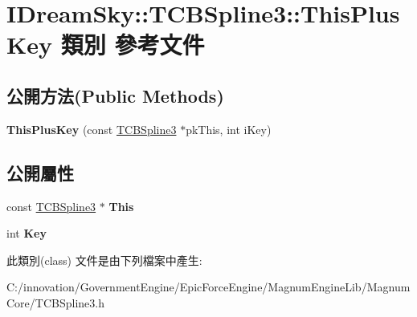 \hypertarget{class_i_dream_sky_1_1_t_c_b_spline3_1_1_this_plus_key}{}\section{I\+Dream\+Sky\+:\+:T\+C\+B\+Spline3\+:\+:This\+Plus\+Key 類別 參考文件}
\label{class_i_dream_sky_1_1_t_c_b_spline3_1_1_this_plus_key}
\subsection*{公開方法(Public Methods)}
\begin{DoxyCompactItemize}
\item 
{\bfseries This\+Plus\+Key} (const \hyperlink{class_i_dream_sky_1_1_t_c_b_spline3}{T\+C\+B\+Spline3} $\ast$pk\+This, int i\+Key)\hypertarget{class_i_dream_sky_1_1_t_c_b_spline3_1_1_this_plus_key_af0bde553dbdf20dcd4c6c80776cfd0ea}{}\label{class_i_dream_sky_1_1_t_c_b_spline3_1_1_this_plus_key_af0bde553dbdf20dcd4c6c80776cfd0ea}

\end{DoxyCompactItemize}
\subsection*{公開屬性}
\begin{DoxyCompactItemize}
\item 
const \hyperlink{class_i_dream_sky_1_1_t_c_b_spline3}{T\+C\+B\+Spline3} $\ast$ {\bfseries This}\hypertarget{class_i_dream_sky_1_1_t_c_b_spline3_1_1_this_plus_key_a44e9c4987379b9268c7bd4bdf39a0fde}{}\label{class_i_dream_sky_1_1_t_c_b_spline3_1_1_this_plus_key_a44e9c4987379b9268c7bd4bdf39a0fde}

\item 
int {\bfseries Key}\hypertarget{class_i_dream_sky_1_1_t_c_b_spline3_1_1_this_plus_key_a114dbde73cdf78af8a7df37dd6e7c49a}{}\label{class_i_dream_sky_1_1_t_c_b_spline3_1_1_this_plus_key_a114dbde73cdf78af8a7df37dd6e7c49a}

\end{DoxyCompactItemize}


此類別(class) 文件是由下列檔案中產生\+:\begin{DoxyCompactItemize}
\item 
C\+:/innovation/\+Government\+Engine/\+Epic\+Force\+Engine/\+Magnum\+Engine\+Lib/\+Magnum\+Core/T\+C\+B\+Spline3.\+h\end{DoxyCompactItemize}
